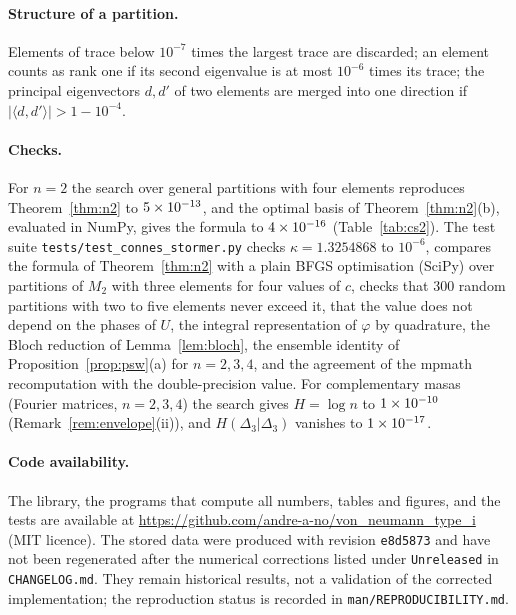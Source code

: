 \documentclass[11pt]{article}
\theoremstyle{plain}
\theoremstyle{definition}
\theoremstyle{remark}
\begin{document}
\paragraph{Structure of a partition.} Elements of trace below $10^{-7}$ times the largest trace are discarded; an element counts
as rank one if its second eigenvalue is at most $10^{-6}$ times its trace; the principal eigenvectors $d,d'$ of two elements are
merged into one direction if $|\langle d,d'\rangle|>1-10^{-4}$.

\paragraph{Checks.} For $n=2$ the search over general partitions with four elements reproduces Theorem~\ref{thm:n2} to
$5\times10^{-13}$, and the optimal basis of Theorem~\ref{thm:n2}(b), evaluated in NumPy, gives the formula to $4\times10^{-16}$
(Table~\ref{tab:cs2}). The test suite \texttt{tests/\allowbreak test\_\allowbreak connes\_\allowbreak stormer.py} checks
$\kappa=1.3254868$ to $10^{-6}$, compares the formula of Theorem~\ref{thm:n2} with a plain BFGS optimisation (SciPy) over
partitions of $M_2$ with three elements for four values of $c$, checks that $300$ random partitions with two to five elements
never exceed it, that the value does not depend on the phases of $U$, the integral representation of $\varphi$ by quadrature,
the Bloch reduction of Lemma~\ref{lem:bloch}, the ensemble identity of Proposition~\ref{prop:psw}(a) for $n=2,3,4$, and the
agreement of the mpmath recomputation with the double-precision value. For complementary masas (Fourier matrices, $n=2,3,4$)
the search gives $H=\log n$ to $1\times10^{-10}$ (Remark~\ref{rem:envelope}(ii)), and $H(\Delta_3|\Delta_3)$ vanishes to $1\times10^{-17}$.

\paragraph{Code availability.} The library, the programs that compute all numbers, tables and figures, and the tests are
available at \url{https://github.com/andre-a-no/von_neumann_type_i} (MIT licence).
The stored data were produced with revision \texttt{e8d5873} and have not been regenerated after the numerical
corrections listed under \texttt{Unreleased} in \texttt{CHANGELOG.md}. They remain historical results, not a
validation of the corrected implementation; the reproduction status is recorded in \texttt{man/REPRODUCIBILITY.md}.
\end{document}
